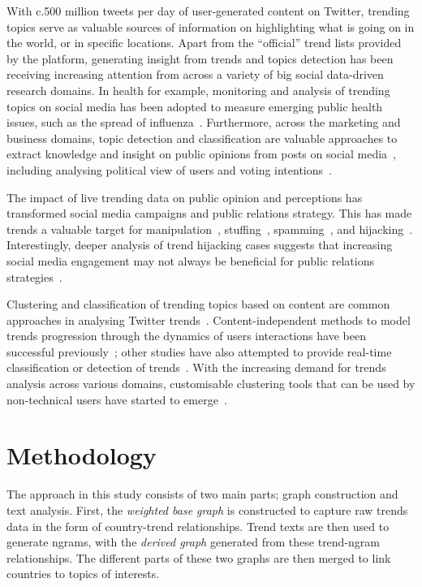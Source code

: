 \documentclass[utf8]{frontiersSCNS} %
\begin{document}
With c.500 million tweets per day of user-generated content on Twitter, trending topics serve as valuable sources of information on highlighting what is going on in the world, or in specific locations. Apart from the ``official'' trend lists provided by the platform, generating insight from trends and topics detection has been receiving increasing attention from across a variety of big social data-driven research domains. In health for example, monitoring and analysis of trending topics on social media has been adopted to measure emerging public health issues, such as the spread of influenza~\cite{Achrekar2011,Parker2015}. Furthermore, across the marketing and business domains, topic detection and classification are valuable approaches to extract knowledge and insight on public opinions from posts on social media~\cite{blamey-et-al-2012,blamey-et-al-2013,Bello2013,mostafa-et-al-ai2016,albishry-et-al:ssei2018}, including analysing political view of users and voting intentions~\cite{oatley+crick:2014,Fang2015}.

The impact of live trending data on public opinion and perceptions has transformed social media campaigns and public relations strategy. This has made trends a valuable target for manipulation~\cite{Zhang2017}, stuffing~\cite{Irani2010}, spamming~\cite{Sedhai2015,Chu2012}, and hijacking~\cite{VanDam2016}. Interestingly, deeper analysis of trend hijacking cases suggests that increasing social media engagement may not always be beneficial for public relations strategies~\cite{Sanderson2016,albishry-et-al:ssei2018}.

Clustering and classification of trending topics based on content are common approaches in analysing Twitter trends~\cite{Zubiaga2011,Benhardus2013,Ferragina2015,albishry-et-al:iccci2017}. Content-independent methods to model trends progression through the dynamics of users interactions have been successful previously~\cite{TenThij2016}; other studies have also attempted to provide real-time classification or detection of trends~\cite{Mathioudakis2010,Zubiaga2015}. With the increasing demand for trends analysis across various domains, customisable clustering tools that can be used by non-technical users have started to emerge~\cite{Arn2018}.

\section{Methodology}\label{method}

The approach in this study consists of two main parts; graph construction and text analysis. First, the {\emph{weighted base graph}} is constructed to capture raw trends data in the form of country-trend relationships. Trend texts are then used to generate ngrams, with the {\emph{derived graph}} generated from these trend-ngram relationships. The different parts of these two graphs are then merged to link countries to topics of interests.
\end{document}
